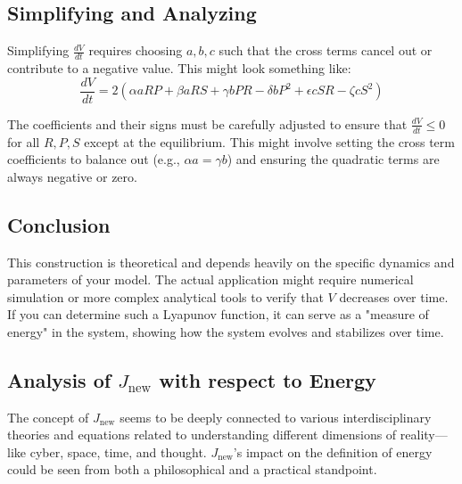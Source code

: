 \documentclass{article}
\begin{document}
\subsection*{Simplifying and Analyzing}
Simplifying \( \frac{dV}{dt} \) requires choosing \( a, b, c \) such that the cross terms cancel out or contribute to a negative value. This might look something like:
\[ \frac{dV}{dt} = 2(\alpha aR P + \beta aRS + \gamma bPR - \delta bP^2 + \epsilon cSR - \zeta cS^2) \]

The coefficients and their signs must be carefully adjusted to ensure that \( \frac{dV}{dt} \leq 0 \) for all \( R, P, S \) except at the equilibrium. This might involve setting the cross term coefficients to balance out (e.g., \( \alpha a = \gamma b \)) and ensuring the quadratic terms are always negative or zero.

\subsection*{Conclusion}
This construction is theoretical and depends heavily on the specific dynamics and parameters of your model. The actual application might require numerical simulation or more complex analytical tools to verify that \( V \) decreases over time. If you can determine such a Lyapunov function, it can serve as a "measure of energy" in the system, showing how the system evolves and stabilizes over time.
\subsection*{Analysis of $J_{\text{new}}$ with respect to Energy}
The concept of $J_{\text{new}}$ seems to be deeply connected to various interdisciplinary theories and equations related to understanding different dimensions of reality---like cyber, space, time, and thought. $J_{\text{new}}$'s impact on the definition of energy could be seen from both a philosophical and a practical standpoint.
\end{document}
